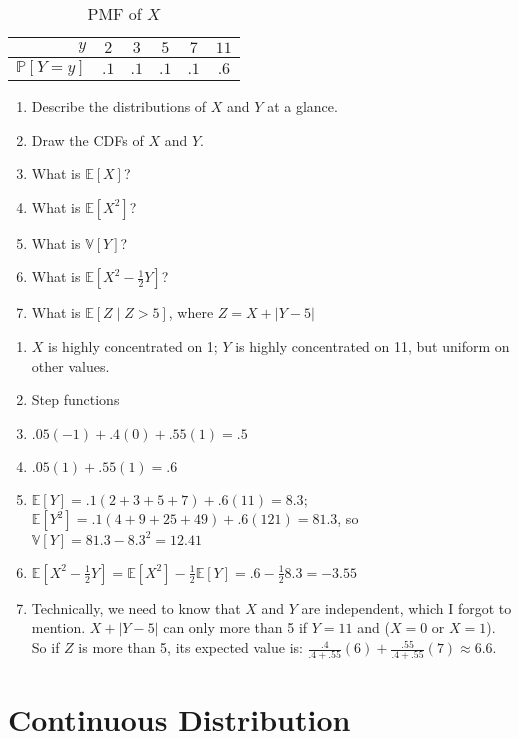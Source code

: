 \documentclass{article}
\begin{document}
\begin{table}[htbp]
\centering
\begin{tabular}{r|ccccc}
$y$ & $2$ & $3$ & $5$ & $7$ & $11$ \\
\hline
$\mathbb{P}[Y = y]$ & $.1$ & $.1$ & $.1$ & $.1$ & $.6$ \\
\end{tabular}
\caption{PMF of $X$}
\label{tbl:y_dist}
\end{table}

\begin{enumerate}
\item Describe the distributions of $X$ and $Y$ at a glance.
\item Draw the CDFs of $X$ and $Y$.
\item What is $\mathbb{E}[X]$?
\item What is $\mathbb{E}[X^2]$?
\item What is $\mathbb{V}[Y]$?
\item What is $\mathbb{E}[X^2 - \frac12 Y]$?
\item What is $\mathbb{E}[Z \mid Z > 5]$, where $Z = X + |Y - 5|$
\end{enumerate}

\begin{solution}
\begin{enumerate}
\item $X$ is highly concentrated on 1; $Y$ is highly concentrated on 11, but uniform on other values.
\item Step functions
\item $.05(-1) + .4(0) + .55(1) = .5$
\item $.05(1) + .55(1) = .6$
\item $\mathbb{E}[Y] = .1(2 + 3 + 5 + 7) + .6(11) = 8.3$; $\mathbb{E}[Y^2] = .1(4 + 9 + 25 + 49) + .6(121) = 81.3$, so $\mathbb{V}[Y] = 81.3 - 8.3^2 = 12.41$
\item $\mathbb{E}[X^2 - \frac12 Y] = \mathbb{E}[X^2] - \frac12 \mathbb{E}[Y] = .6 - \frac12 8.3 = -3.55$
\item Technically, we need to know that $X$ and $Y$ are independent, which I forgot to mention. $X + |Y - 5|$ can only more than 5 if $Y = 11$ and ($X = 0$ or $X = 1$). So if $Z$ is more than 5, its expected value is: $\frac{.4}{.4 + .55}(6) + \frac{.55}{.4 + .55}(7) \approx 6.6$.
\end{enumerate}
\end{solution}

\section{Continuous Distribution}
\end{document}
